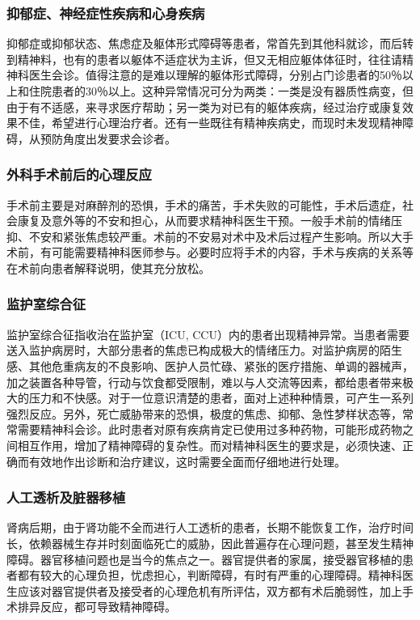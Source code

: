 \subsubsection{抑郁症、神经症性疾病和心身疾病}

抑郁症或抑郁状态、焦虑症及躯体形式障碍等患者，常首先到其他科就诊，而后转到精神料，也有的患者以躯体不适症状为主诉，但又无相应躯体体征时，往往请精神科医生会诊。值得注意的是难以理解的躯体形式障碍，分别占门诊患者的50％以上和住院患者的30％以上。这种异常情况可分为两类：一类是没有器质性病变，但由于有不适感，来寻求医疗帮助；另一类为对已有的躯体疾病，经过治疗或康复效果不佳，希望进行心理治疗者。还有一些既往有精神疾病史，而现时未发现精神障碍，从预防角度出发要求会诊者。

\subsubsection{外科手术前后的心理反应}

手术前主要是对麻醉剂的恐惧，手术的痛苦，手术失败的可能性，手术后遗症，社会康复及意外等的不安和担心，从而要求精神科医生干预。一般手术前的情绪压抑、不安和紧张焦虑较严重。术前的不安易对术中及术后过程产生影响。所以大手术前，有可能需要精神科医师参与。必要时应将手术的内容，手术与疾病的关系等在术前向患者解释说明，使其充分放松。

\subsubsection{监护室综合征}

监护室综合征指收治在监护室（ICU,
CCU）内的患者出现精神异常。当患者需要送入监护病房时，大部分患者的焦虑已构成极大的情绪压力。对监护病房的陌生感、其他危重病友的不良影响、医护人员忙碌、紧张的医疗措施、单调的器械声，加之装置各种导管，行动与饮食都受限制，难以与人交流等因素，都给患者带来极大的压力和不快感。对于一位意识清楚的患者，面对上述种种情景，可产生一系列强烈反应。另外，死亡威胁带来的恐惧，极度的焦虑、抑郁、急性梦样状态等，常常需要精神科会诊。此时患者对原有疾病肯定已使用过多种药物，可能形成药物之间相互作用，增加了精神障碍的复杂性。而对精神科医生的要求是，必须快速、正确而有效地作出诊断和治疗建议，这时需要全面而仔细地进行处理。

\subsubsection{人工透析及脏器移植}

肾病后期，由于肾功能不全而进行人工透析的患者，长期不能恢复工作，治疗时间长，依赖器械生存并时刻面临死亡的威胁，因此普遍存在心理问题，甚至发生精神障碍。器官移植问题也是当今的焦点之一。器官提供者的家属，接受器官移植的患者都有较大的心理负担，忧虑担心，判断障碍，有时有严重的心理障碍。精神科医生应该对器官提供者及接受者的心理危机有所评估，双方都有术后脆弱性，加上手术排异反应，都可导致精神障碍。

